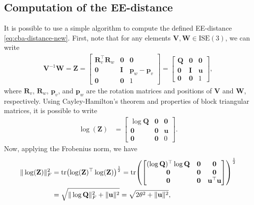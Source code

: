 \subsection{Computation of the EE-distance}\label{sec:collaborative-ee-distance-computation}
It is possible to use a simple algorithm to compute the defined EE-distance \eqref{eq:cba-distance-new}. First, note that for any elements $\mathbf{V}, \mathbf{W}\in\text{ISE}(3)$, we can write
\begin{align}
    \mathbf{V}^{-1}\mathbf{W} = \mathbf{Z} = \begin{bmatrix}
        \mathbf{R}_v^\top\mathbf{R}_w & \mathbf{0} & \mathbf{0}\\
        \mathbf{0} & \mathbf{I} & \mathbf{p}_w - \mathbf{p}_v\\
        \mathbf{0} & \mathbf{0} & 1
    \end{bmatrix} = \begin{bmatrix}
        \mathbf{Q} & \mathbf{0} & \mathbf{0}\\
        \mathbf{0} & \mathbf{I} & \mathbf{u}\\
        \mathbf{0} & \mathbf{0} & 1
    \end{bmatrix},
\end{align}
where $\mathbf{R}_v$, $\mathbf{R}_w$, $\mathbf{p}_v$, and $\mathbf{p}_w$ are the rotation matrices and positions of $\mathbf{V}$ and $\mathbf{W}$, respectively. Using Cayley-Hamilton's theorem and properties of block triangular matrices, it is possible to write
\begin{align}
    \log(\mathbf{Z}) &= \begin{bmatrix}
        \log\mathbf{Q} & \mathbf{0} & \mathbf{0}\\
        \mathbf{0} & \mathbf{0} & \mathbf{u}\\
        \mathbf{0} & \mathbf{0} & 0
    \end{bmatrix}.
\end{align}
Now, applying the Frobenius norm, we have
\begin{align}
    \|\log(\mathbf{Z})\|_F^2 &= \operatorname{tr}\bigl(\log(\mathbf{Z})^\top\log(\mathbf{Z})\bigr)^\frac{1}{2} = \operatorname{tr}\!\left(\begin{bmatrix}
        (\log\mathbf{Q})^\top\log\mathbf{Q} & \mathbf{0} & \mathbf{0}\\
        \mathbf{0} & \mathbf{0} & \mathbf{0}\\
        \mathbf{0} & \mathbf{0} & \mathbf{u}^\top\mathbf{u}
    \end{bmatrix}\right)^\frac{1}{2} \\
    &= \sqrt{\|\log\mathbf{Q}\|_F^2 + \|\mathbf{u}\|^2} = \sqrt{2\theta^2 + \|\mathbf{u}\|^2},
\end{align}
